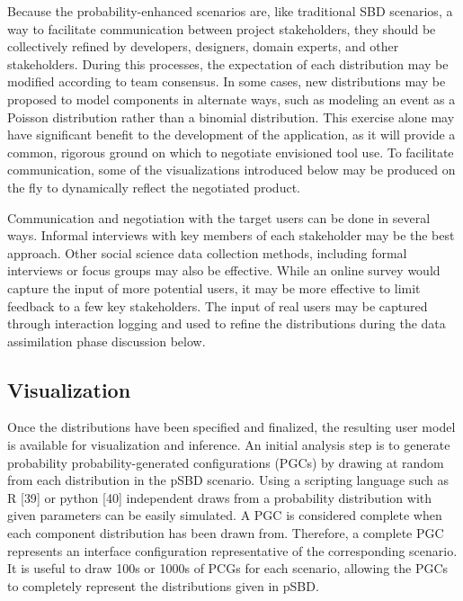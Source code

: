 \documentclass[]{article}
\begin{document}
Because the probability-enhanced scenarios are, like traditional SBD
scenarios, a way to facilitate communication between project
stakeholders, they should be collectively refined by developers,
designers, domain experts, and other stakeholders. During this
processes, the expectation of each distribution may be modified
according to team consensus. In some cases, new distributions may be
proposed to model components in alternate ways, such as modeling an
event as a Poisson distribution rather than a binomial distribution.
This exercise alone may have significant benefit to the development of
the application, as it will provide a common, rigorous ground on which
to negotiate envisioned tool use. To facilitate communication, some of
the visualizations introduced below may be produced on the fly to
dynamically reflect the negotiated product.

Communication and negotiation with the target users can be done in
several ways. Informal interviews with key members of each stakeholder
may be the best approach. Other social science data collection methods,
including formal interviews or focus groups may also be effective. While
an online survey would capture the input of more potential users, it may
be more effective to limit feedback to a few key stakeholders. The input
of real users may be captured through interaction logging and used to
refine the distributions during the data assimilation phase discussion
below.

\subsection{Visualization}\label{visualization}

Once the distributions have been specified and finalized, the resulting
user model is available for visualization and inference. An initial
analysis step is to generate probability probability-generated
configurations (PGCs) by drawing at random from each distribution in the
pSBD scenario. Using a scripting language such as R {[}39{]} or python
{[}40{]} independent draws from a probability distribution with given
parameters can be easily simulated. A PGC is considered complete when
each component distribution has been drawn from. Therefore, a complete
PGC represents an interface configuration representative of the
corresponding scenario. It is useful to draw 100s or 1000s of PCGs for
each scenario, allowing the PGCs to completely represent the
distributions given in pSBD.
\end{document}
